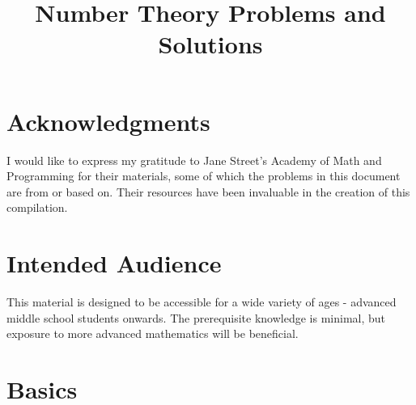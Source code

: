 \documentclass{article}
\title{Number Theory Problems and Solutions}
\begin{document}
\maketitle

\section*{Acknowledgments}
I would like to express my gratitude to Jane Street's Academy of Math and Programming for their materials, some of which the problems in this document are from or based on. Their resources have been invaluable in the creation of this compilation.

\section*{Intended Audience}
This material is designed to be accessible for a wide variety of ages - advanced middle school students onwards. The prerequisite knowledge is minimal, but exposure to more advanced mathematics will be beneficial.

\section{Basics}
\end{document}
